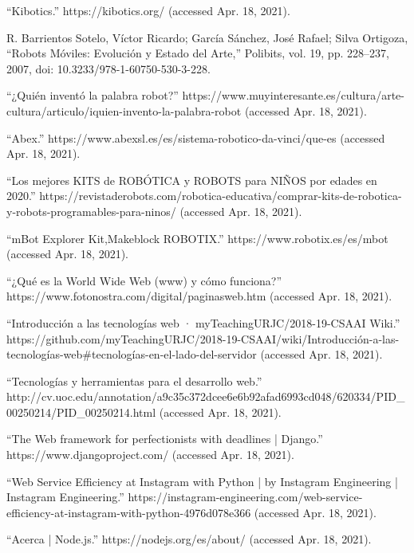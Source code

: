 \begin{thebibliography}{69}

``Kibotics.” https://kibotics.org/ (accessed Apr. 18, 2021).

 R. Barrientos Sotelo, Víctor Ricardo; García Sánchez, José Rafael; Silva Ortigoza, ``Robots Móviles: Evolución y Estado del Arte,” Polibits, vol. 19, pp. 228–237, 2007, doi: 10.3233/978-1-60750-530-3-228.

 ``¿Quién inventó la palabra robot?” https://www.muyinteresante.es/cultura/arte-cultura/articulo/iquien-invento-la-palabra-robot (accessed Apr. 18, 2021).

 ``Abex.” https://www.abexsl.es/es/sistema-robotico-da-vinci/que-es (accessed Apr. 18, 2021).

 ``Los mejores KITS de ROBÓTICA y ROBOTS para NIÑOS por edades en 2020.” https://revistaderobots.com/robotica-educativa/comprar-kits-de-robotica-y-robots-programables-para-ninos/ (accessed Apr. 18, 2021).

	``mBot Explorer Kit,Makeblock ROBOTIX.” https://www.robotix.es/es/mbot (accessed Apr. 18, 2021).

	``¿Qué es la World Wide Web (www) y cómo funciona?” https://www.fotonostra.com/digital/paginasweb.htm (accessed Apr. 18, 2021).

 ``Introducción a las tecnologías web · myTeachingURJC/2018-19-CSAAI Wiki.” https://github.com/myTeachingURJC/2018-19-CSAAI/wiki/Introducción-a-las-tecnologías-web\#tecnologías-en-el-lado-del-servidor (accessed Apr. 18, 2021).


	``Tecnologías y herramientas para el desarrollo web.” http://cv.uoc.edu/annotation/a9c35c372dcee6e6b92afad6993cd048/620334/PID\_00250214/PID\_00250214.html (accessed Apr. 18, 2021).


``The Web framework for perfectionists with deadlines | Django.” https://www.djangoproject.com/ (accessed Apr. 18, 2021).

	``Web Service Efficiency at Instagram with Python | by Instagram Engineering | Instagram Engineering.” https://instagram-engineering.com/web-service-efficiency-at-instagram-with-python-4976d078e366  (accessed Apr. 18, 2021).

	``Acerca | Node.js.” https://nodejs.org/es/about/ (accessed Apr. 18, 2021).


\end{thebibliography}
